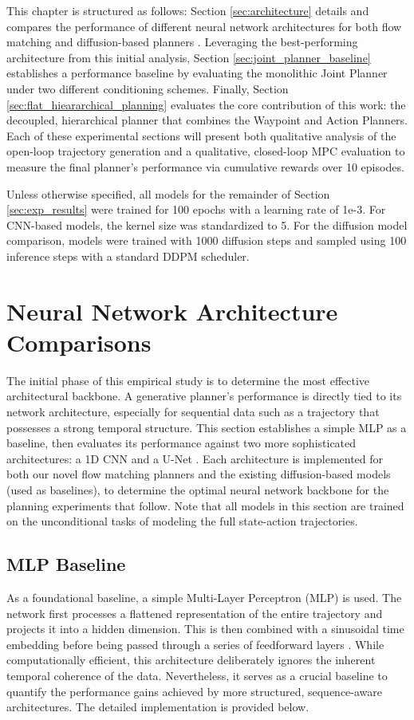 This chapter is structured as follows: Section \ref{sec:architecture} details and compares the performance of different neural network architectures for both flow matching and diffusion-based planners \cite{jannerPlanningDiffusionFlexible2022}. Leveraging the best-performing architecture from this initial analysis, Section \ref{sec:joint_planner_baseline}	 establishes a performance baseline by evaluating the monolithic Joint Planner under two different conditioning schemes. Finally, Section \ref{sec:flat_hieararchical_planning} evaluates the core contribution of this work: the decoupled, hierarchical planner that combines the Waypoint and Action Planners. Each of these experimental sections will present both qualitative analysis of  the open-loop trajectory generation and a qualitative, closed-loop MPC evaluation to measure the final planner’s performance via cumulative rewards over 10 episodes.

Unless otherwise specified, all models for the remainder of Section \ref{sec:exp_results} were trained for 100 epochs with a learning rate of 1e-3. For CNN-based models, the kernel size was standardized to 5. For the diffusion model comparison, models were trained with 1000 diffusion steps and sampled using 100 inference steps with a standard DDPM scheduler.

\section{Neural Network Architecture Comparisons}
The initial phase of this empirical study is to determine the most effective architectural backbone. A generative planner’s performance is directly tied to its network architecture, especially for sequential data such as a trajectory that possesses a strong temporal structure. This section establishes a simple MLP as a baseline, then evaluates its performance against two more sophisticated architectures: a 1D CNN \cite{osheaIntroductionConvolutionalNeural2015} and a U-Net \cite{ronnebergerUNetConvolutionalNetworks2015a}. Each architecture is implemented for both our novel flow matching planners and the existing diffusion-based models (used as baselines), to determine the optimal neural network backbone for the planning experiments that follow. Note that all models in this section are trained on the unconditional tasks of modeling the full state-action trajectories.

\label{sec:architecture}
\subsection{MLP Baseline}
As a foundational baseline, a simple Multi-Layer Perceptron (MLP) is used. The network first processes a flattened representation of the entire trajectory and projects it into a hidden dimension. This is then combined with a sinusoidal time embedding before being passed through a series of feedforward layers \cite{vaswaniAttentionAllYou2023}. While computationally efficient, this architecture deliberately ignores the inherent temporal coherence of the data. Nevertheless, it serves as a crucial baseline to quantify the performance gains achieved by more structured, sequence-aware architectures. The detailed implementation is provided below.

